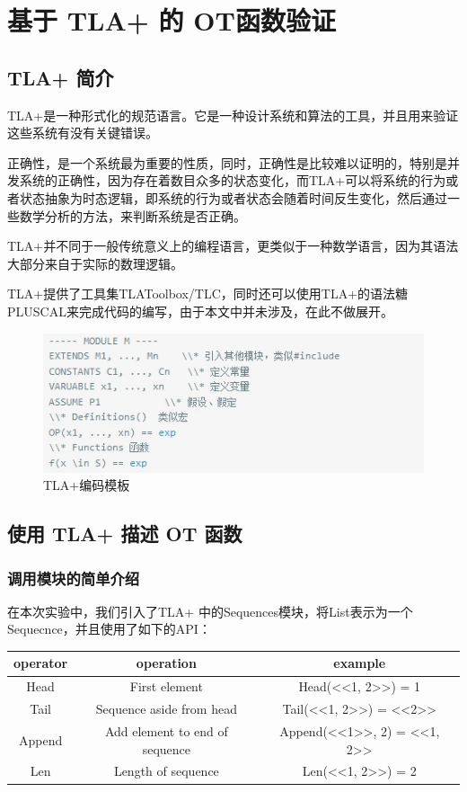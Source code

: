 \chapter{基于 TLA+ 的 OT函数验证} 
\section{TLA+ 简介}
\par TLA+是一种形式化的规范语言。它是一种设计系统和算法的工具，并且用来验证这些系统有没有关键错误。
\par 正确性，是一个系统最为重要的性质，同时，正确性是比较难以证明的，特别是并发系统的正确性，因为存在着数目众多的状态变化，而TLA+可以将系统的行为或者状态抽象为时态逻辑，即系统的行为或者状态会随着时间反生变化，然后通过一些数学分析的方法，来判断系统是否正确。
\par TLA+并不同于一般传统意义上的编程语言，更类似于一种数学语言，因为其语法大部分来自于实际的数理逻辑。
\par TLA+提供了工具集TLAToolbox/TLC，同时还可以使用TLA+的语法糖PLUSCAL来完成代码的编写，由于本文中并未涉及，在此不做展开。
\begin{figure}
\centering
\includegraphics{figures/module.jpg}
\caption{TLA+编码模板}
\label{fig:graph}
\end{figure}

\section{使用 TLA+ 描述 OT 函数}
\subsection{调用模块的简单介绍}
\par 在本次实验中，我们引入了TLA+ 中的Sequences模块，将List表示为一个Sequecnce，并且使用了如下的API：\\
\begin{tabular}{ccc}
\hline
operator& operation& example \\
\hline  
 Head& First element &Head(<<1, 2>>) = 1\\
 Tail& Sequence aside from head &Tail(<<1, 2>>) = <<2>>\\
 Append& Add element to end of sequence &Append(<<1>>, 2) = <<1, 2>>\\ 
 Len& Length of sequence &Len(<<1, 2>>) = 2\\
\hline %
\end{tabular}
 	 	

